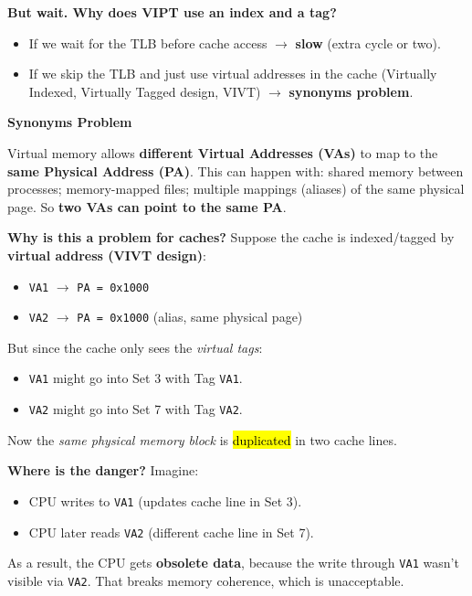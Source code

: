 \highspace
\begin{flushleft}
    \textcolor{Red2}{ \textbf{But wait. Why does VIPT use an index and a tag?}}
\end{flushleft}
\begin{itemize}
    \item If we wait for the TLB before cache access $\rightarrow$ \textbf{slow} (extra cycle or two).
    \item If we skip the TLB and just use virtual addresses in the cache (Virtually Indexed, Virtually Tagged design, VIVT) $\rightarrow$ \textbf{synonyms problem}.
\end{itemize}

\begin{flushleft}
    \textcolor{Red2}{ \textbf{Synonyms Problem}}
\end{flushleft}
Virtual memory allows \textbf{different Virtual Addresses (VAs)} to map to the \textbf{same Physical Address (PA)}. This can happen with: shared memory between processes; memory-mapped files; multiple mappings (aliases) of the same physical page. So \textbf{two VAs can point to the same PA}.

\highspace
\textcolor{Red2}{ \textbf{Why is this a problem for caches?}} Suppose the cache is indexed/tagged by \textbf{virtual address (VIVT design)}:
\begin{itemize}
    \item \texttt{VA1} $\rightarrow$ \texttt{PA = 0x1000}
    \item \texttt{VA2} $\rightarrow$ \texttt{PA = 0x1000} (alias, same physical page)
\end{itemize}
But since the cache only sees the \emph{virtual tags}:
\begin{itemize}
    \item \texttt{VA1} might go into Set 3 with Tag \texttt{VA1}.
    \item \texttt{VA2} might go into Set 7 with Tag \texttt{VA2}.
\end{itemize}
Now the \emph{same physical memory block} is \hl{duplicated} in two cache lines.

\highspace
\textcolor{Red2}{ \textbf{Where is the danger?}} Imagine:
\begin{itemize}
    \item CPU writes to \texttt{VA1} (updates cache line in Set 3).
    \item CPU later reads \texttt{VA2} (different cache line in Set 7).
\end{itemize}
As a result, the CPU gets \textbf{obsolete data}, because the write through \texttt{VA1} wasn't visible via \texttt{VA2}. That breaks memory coherence, which is unacceptable.

